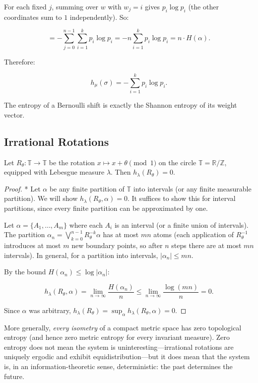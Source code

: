 For each fixed $j$, summing over $w$ with $w_j = i$ gives $p_i \log p_i$ (the other coordinates sum to $1$ independently). So:

\[
= -\sum_{j=0}^{n-1} \sum_{i=1}^k p_i \log p_i = -n \sum_{i=1}^k p_i \log p_i = n \cdot H(\alpha).
\]

Therefore:

\[
\boxed{h_\mu(\sigma) = -\sum_{i=1}^k p_i \log p_i.}
\]

The entropy of a Bernoulli shift is exactly the Shannon entropy of its weight vector.

\subsection{Irrational Rotations}\label{sec:11.6.2}

\begin{proposition}\label{prop:11.21.}
Let $R_\theta \colon \mathbb{T} \to \mathbb{T}$ be the rotation $x \mapsto x + \theta \pmod{1}$ on the circle $\mathbb{T} = \mathbb{R}/\mathbb{Z}$, equipped with Lebesgue measure $\lambda$. Then $h_\lambda(R_\theta) = 0$.
\end{proposition}


\begin{proof}
* Let $\alpha$ be any finite partition of $\mathbb{T}$ into intervals (or any finite measurable partition). We will show $h_\lambda(R_\theta, \alpha) = 0$. It suffices to show this for interval partitions, since every finite partition can be approximated by one.

Let $\alpha = \{A_1, \ldots, A_m\}$ where each $A_i$ is an interval (or a finite union of intervals). The partition $\alpha_n = \bigvee_{k=0}^{n-1} R_\theta^{-k}\alpha$ has at most $mn$ atoms (each application of $R_\theta^{-1}$ introduces at most $m$ new boundary points, so after $n$ steps there are at most $mn$ intervals). In general, for a partition into intervals, $|\alpha_n| \leq mn$.

By the bound $H(\alpha_n) \leq \log|\alpha_n|$:

\[
h_\lambda(R_\theta, \alpha) = \lim_{n \to \infty} \frac{H(\alpha_n)}{n} \leq \lim_{n \to \infty} \frac{\log(mn)}{n} = 0.
\]

Since $\alpha$ was arbitrary, $h_\lambda(R_\theta) = \sup_\alpha h_\lambda(R_\theta, \alpha) = 0$.
\end{proof}


\begin{remark}
More generally, \textit{every isometry} of a compact metric space has zero topological entropy (and hence zero metric entropy for every invariant measure). Zero entropy does not mean the system is uninteresting---irrational rotations are uniquely ergodic and exhibit equidistribution---but it does mean that the system is, in an information-theoretic sense, deterministic: the past determines the future.
\end{remark}



